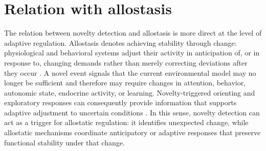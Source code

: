 \documentclass[a4paper]{article}
\begin{document}
   \section{Relation with allostasis}
   The relation between novelty detection and allostasis is more direct at the level of adaptive regulation. Allostasis denotes achieving stability through change: physiological and behavioral systems adjust their activity in anticipation of, or in response to, changing demands rather than merely correcting deviations after they occur \cite{mcewen-1998-stress-adaptation-and-disease-allostasis-and-allostatic-load,sterling-2012-allostasis-a-model-of-predictive-regulation}. A novel event signals that the current environmental model may no longer be sufficient and therefore may require changes in attention, behavior, autonomic state, endocrine activity, or learning. Novelty-triggered orienting and exploratory responses can consequently provide information that supports adaptive adjustment to uncertain conditions \cite{ranganath-rainer-2003-neural-mechanisms-for-detecting-and-remembering-novel-events,tapper-molas-2020-midbrain-circuits-of-novelty-processing}. In this sense, novelty detection can act as a trigger for allostatic regulation: it identifies unexpected change, while allostatic mechanisms coordinate anticipatory or adaptive responses that preserve functional stability under that change.

   
   
\end{document}
